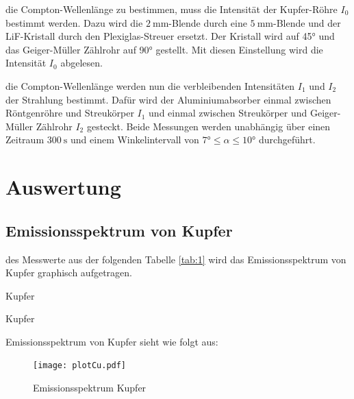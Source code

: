     \justifying die Compton-Wellenlänge zu bestimmen, muss die Intensität der Kupfer-Röhre $I_0$ bestimmt werden. Dazu wird die $\SI{2}{\milli\meter}$-Blende
    durch eine $\SI{5}{\milli\meter}$-Blende und der LiF-Kristall durch den Plexiglas-Streuer ersetzt. Der Kristall wird auf 45° und das Geiger-Müller Zählrohr auf 90° gestellt.
    Mit diesen Einstellung wird die Intensität $I_0$ abgelesen.

     \justifying die Compton-Wellenlänge werden nun die verbleibenden Intensitäten $I_1$ und $I_2$ der Strahlung bestimmt. Dafür wird der Aluminiumabsorber 
     einmal zwischen Röntgenröhre und Streukörper $I_1$ und einmal zwischen Streukörper und Geiger-Müller Zählrohr $I_2$ gesteckt. Beide Messungen werden unabhängig über einen 
     Zeitraum $\SI{300}{\second}$ und einem Winkelintervall von $7° \leq \alpha \leq 10°$ durchgeführt. 






\section{Auswertung}

    \subsection{Emissionsspektrum von Kupfer}

    \justifying des Messwerte aus der folgenden Tabelle \ref{tab:1} wird das Emissionsspektrum von Kupfer graphisch aufgetragen.

    \begin{table}[H]
        \centering
        
        \caption{Kupfer}
        \label{tab:1}
    \end{table}

    \begin{table}[H]
        \centering
        
        \caption{Kupfer}
        \label{tab:2}
    \end{table}

    \justifying Emissionsspektrum von Kupfer sieht wie folgt aus:

    \begin{figure}[H]
        \centering
        \texttt{[image: plotCu.pdf]}
        \caption{Emissionsspektrum Kupfer}
        \label{fig:2}
    \end{figure}

